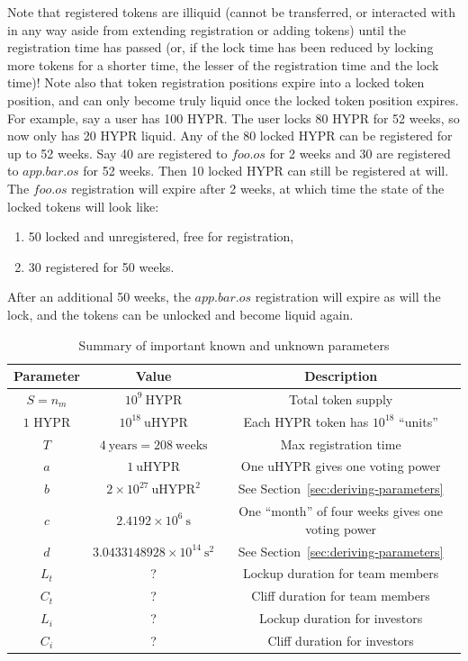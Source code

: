 \documentclass{article}
\begin{document}
Note that registered tokens are illiquid (cannot be transferred, or interacted with in any way aside from extending registration or adding tokens) until the registration time has passed (or, if the lock time has been reduced by locking more tokens for a shorter time, the lesser of the registration time and the lock time)!
Note also that token registration positions expire into a locked token position, and can only become truly liquid once the locked token position expires.
For example, say a user has 100 HYPR.
The user locks 80 HYPR for 52 weeks, so now only has 20 HYPR liquid.
Any of the 80 locked HYPR can be registered for up to 52 weeks.
Say 40 are registered to $foo.os$ for 2 weeks and 30 are registered to $app.bar.os$ for 52 weeks.
Then 10 locked HYPR can still be registered at will.
The $foo.os$ registration will expire after 2 weeks, at which time the state of the locked tokens will look like:
\begin{enumerate}
    \item 50 locked and unregistered, free for registration,
    \item 30 registered for 50 weeks.
\end{enumerate}
After an additional 50 weeks, the $app.bar.os$ registration will expire as will the lock, and the tokens can be unlocked and become liquid again.

\begin{table}[htbp]
    \centering
    \caption{Summary of important known and unknown parameters}
    \label{tab:student-performance}
    \begin{tabular}{|c|c|c|}
    \hline
    \textbf{Parameter} & \textbf{Value} & \textbf{Description} \\
    \hline
    $S = n_m$ & $10^9~\text{HYPR}$ & Total token supply \\
    $1$ HYPR & $10^{18}~\text{uHYPR}$ & Each HYPR token has $10^{18}$ ``units'' \\
    $T$ & $4~\text{years} = 208~\text{weeks}$ & Max registration time \\
    $a$ & $1~\text{uHYPR}$ & One uHYPR gives one voting power \\
    $b$ & $2 \times 10^{27}~\text{uHYPR}^2$ & See Section~\ref{sec:deriving-parameters} \\
    $c$ & $2.4192 \times 10^6~\text{s}$ & One ``month'' of four weeks gives one voting power \\
    $d$ & $3.0433148928 \times 10^{14}~\text{s}^2$ & See Section~\ref{sec:deriving-parameters} \\
    $L_t$ & ? & Lockup duration for team members \\
    $C_t$ & ? & Cliff duration for team members \\
    $L_i$ & ? & Lockup duration for investors \\
    $C_i$ & ? & Cliff duration for investors \\
    \hline
	\end{tabular}
\end{table}
\end{document}
